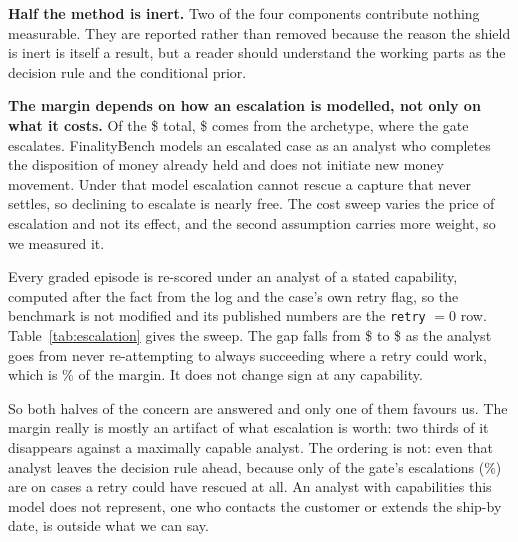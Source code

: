 \documentclass[conference]{IEEEtran}
\begin{document}
\textbf{Half the method is inert.} Two of the four components contribute
nothing measurable. They are reported rather than removed because the reason the
shield is inert is itself a result, but a reader should understand the working
parts as the decision rule and the conditional prior.

\textbf{The margin depends on how an escalation is modelled, not only on what
it costs.} Of the \$\vsGateReduction{} total, \$\escalatingContribution{} comes
from
the \texttt{\escalatingArchetype} archetype, where the gate escalates.
FinalityBench models an escalated case as an analyst who completes the
disposition of money already held and does not initiate new money movement.
Under that model escalation cannot rescue a capture that never settles, so
declining to escalate is nearly free. The cost sweep varies the price of
escalation and not its effect, and the second assumption carries more weight,
so we measured it.

\begin{table}[t] \centering \caption{Mean position gap over the finality gate
as the analyst becomes more capable. \texttt{retry} is the probability that an
escalated case whose capture could have been re-attempted successfully is
rescued. The first row is FinalityBench's own analyst.} \label{tab:escalation}
\footnotesize  \end{table}

Every graded episode is re-scored under an analyst of a stated capability,
computed after the fact from the log and the case's own retry flag, so the
benchmark is not modified and its published numbers are the \texttt{retry}
$=0$ row. Table~\ref{tab:escalation} gives the sweep. The gap falls from
\$\escBaselineGap{} to \$\escFullGap{} as the analyst goes from never
re-attempting to always succeeding where a retry could work, which is
\escShrink\% of the margin. It does not change sign at any capability.

So both halves of the concern are answered and only one of them favours us.
The margin really is mostly an artifact of what escalation is worth: two
thirds of it disappears against a maximally capable analyst. The ordering is
not: even that analyst leaves the decision rule ahead, because only
\escRescuable{} of the gate's \escEscalations{} escalations
(\escRescuablePct\%) are on cases a retry could have rescued at all. An
analyst with capabilities this model does not represent, one who contacts the
customer or extends the ship-by date, is outside what we can say.
\end{document}
